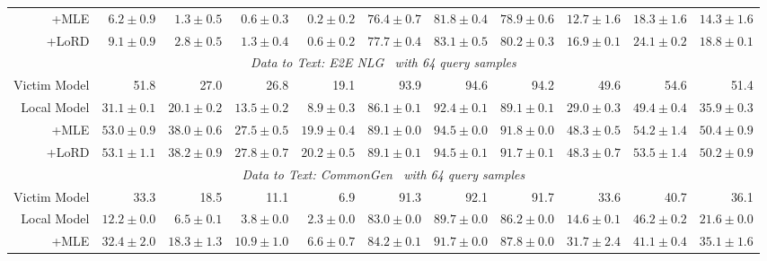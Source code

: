 \documentclass[letterpaper]{article} %
\newcommand{\red}{\cellcolor{lzred!68} } %
\newcommand{\gret}{\cellcolor{lzred!48} } %
\newcommand{\gres}{\cellcolor{lzred!28} } %
\newcommand{\grem}{\cellcolor{lzgreen!18} } %
\newcommand{\grel}{\cellcolor{lzgreen!38} } %
\newcommand{\grexl}{\cellcolor{lzgreen!68} } %
\newcommand{\greyc}{\cellcolor{lzgrey!28} }
\begin{document}
\begin{table*}[t]
{\begin{tabular}{r|rrrrrrrrrr}
+MLE         & \gres   $6.2\pm 0.9$ & \gres  $1.3\pm 0.5$ & \grem  $0.6\pm 0.3$ & \grel  $0.2\pm 0.2$ & \grem $76.4\pm 0.7$ & \gres $81.8\pm 0.4$& \grem  $78.9\pm 0.6$& \gres   $12.7\pm 1.6$& \red  $18.3\pm 1.6$   & \gret $14.3\pm 1.6$  \\
+LoRD         & \grel   $9.1\pm 0.9$ & \grem  $2.8\pm 0.5$ & \grel  $1.3\pm 0.4$ & \grel  $0.6\pm 0.2$ & \grel $77.7\pm 0.4$ & \grel $83.1\pm 0.5$& \grel  $80.2\pm 0.3$& \grel   $16.9\pm 0.1$& \gret  $24.1\pm 0.2$   & \gres $18.8\pm 0.1$  \\\hline
\multicolumn{11}{c}{\emph{Data to Text: E2E NLG~\citep{e2enlg} with 64 query samples}}                                                                             \\\hline
Victim Model & \greyc 51.8& \greyc 27.0& \greyc 26.8& \greyc 19.1& \greyc 93.9& \greyc 94.6& \greyc 94.2& \greyc 49.6 & \greyc 54.6& \greyc 51.4\\
Local Model  & \red  $31.1\pm 0.1$& \gret  $20.1\pm 0.2$& \red  $13.5\pm 0.2$& \red  $8.9\pm 0.3$& \gret  $86.1\pm 0.1$& \grem  $92.4\pm 0.1$& \gres  $89.1\pm 0.1$& \red   $29.0\pm 0.3$& \gret  $49.4\pm 0.4$& \gret  $35.9\pm 0.3$\\
+MLE         & \grexl  $53.0\pm 0.9$ & \grel   $38.0\pm 0.6$& \grel $27.5\pm 0.5$ & \grel $19.9\pm 0.4$ & \gres $89.1\pm 0.0$ & \grel $94.5\pm 0.0$ & \gres $91.8\pm 0.0$ & \grem  $48.3\pm 0.5$& \grel $54.2\pm 1.4$ & \grem $50.4\pm 0.9$ \\
+LoRD         & \grexl  $53.1\pm 1.1$ & \grel   $38.2\pm 0.9$& \grel $27.8\pm 0.7$ & \grexl $20.2\pm 0.5$ & \gres $89.1\pm 0.1$ & \grel $94.5\pm 0.1$ & \gres $91.7\pm 0.1$ & \grem  $48.3\pm 0.7$& \grem $53.5\pm 1.4$ & \grem $50.2\pm 0.9$ \\\hline
\multicolumn{11}{c}{\emph{Data to Text: CommonGen~\citep{commongen} with 64 query samples}}                                                                             \\\hline
Victim Model & \greyc  33.3& \greyc 18.5 & \greyc 11.1& \greyc 6.9& \greyc 91.3& \greyc 92.1& \greyc 91.7& \greyc 33.6 &\greyc 40.7 & \greyc 36.1\\
Local Model  &\red  $12.2\pm 0.0$ &\red  $6.5\pm 0.1$ & \gret  $3.8\pm 0.0$ & \gret  $2.3\pm 0.0$ & \gret  $83.0\pm 0.0$ & \gres  $89.7\pm 0.0$ & \gres  $86.2\pm 0.0$ & \red  $14.6\pm 0.1$ & \grexl  $46.2\pm 0.2$ & \red  $21.6\pm 0.0$ \\
+MLE         & \grem $32.4\pm 2.0$ & \grel $18.3\pm 1.3$ & \grel $10.9\pm 1.0$ & \grel $6.6\pm 0.7$ & \gret $84.2\pm 0.1$ & \grel $91.7\pm 0.0$ & \gres $87.8\pm 0.0$ & \grem $31.7\pm 2.4$ & \grel $41.1\pm 0.4$ & \grem $35.1\pm 1.6$ \\

\end{tabular}}
\end{table*}
\end{document}

